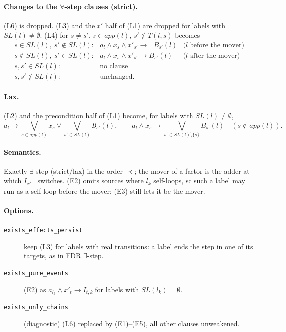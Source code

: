 \documentclass[11pt,a4paper]{article}
\newcommand{\lab}[1]{a_{#1}}            %
\newcommand{\st}[1]{x_{#1}}             %
\newcommand{\stn}[1]{x'_{#1}}           %
\newcommand{\SL}{\mathit{SL}}
\newcommand{\app}{\mathit{app}}
\newcommand{\Bef}{B}
\begin{document}
\paragraph{Changes to the $\forall$-step clauses (strict).}
(L6) is dropped. (L3) and the $x'$ half of (L1) are dropped for labels with $\SL(l) \neq \emptyset$.
(L4) for $s \neq s'$, $s \in \app(l)$, $s' \notin T(l,s)$ becomes
\[
  \begin{array}{lll}
    s \in \SL(l),\ s' \notin \SL(l): & \lab{l} \wedge \st{s} \wedge \stn{s'} \to \neg \Bef_{s'}(l) & \text{($l$ before the mover)}\\
    s \notin \SL(l),\ s' \in \SL(l): & \lab{l} \wedge \st{s} \wedge \stn{s'} \to \Bef_{s'}(l) & \text{($l$ after the mover)}\\
    s, s' \in \SL(l): & \text{no clause} & \\
    s, s' \notin \SL(l): & \text{unchanged.} &
  \end{array}
\]

\paragraph{Lax.} (L2) and the precondition half of (L1) become, for labels with
$\SL(l) \neq \emptyset$,
\[
  \lab{l} \to \textstyle\bigvee_{s \in \app(l)} \st{s} \vee \bigvee_{s' \in \SL(l)} \Bef_{s'}(l),
  \qquad
  \lab{l} \wedge \st{s} \to \textstyle\bigvee_{s' \in \SL(l) \setminus \{s\}} \Bef_{s'}(l) \quad (s \notin \app(l)).
\]

\paragraph{Semantics.} Exactly $\exists$-step (strict/lax) in the order $\prec$; the mover of a
factor is the adder at which $I_{x',\cdot}$ switches. (E2) omits sources where $l_k$ self-loops, so
such a label may run as a self-loop before the mover; (E3) still lets it be the mover.

\paragraph{Options.}
\begin{description}
  \item[\texttt{exists\_effects\_persist}] keep (L3) for labels with real transitions: a label ends
        the step in one of its targets, as in FDR $\exists$-step.
  \item[\texttt{exists\_pure\_events}] (E2) as $\lab{l_k} \wedge \stn{t} \to I_{t,k}$ for labels with
        $\SL(l_k) = \emptyset$.
  \item[\texttt{exists\_only\_chains}] (diagnostic) (L6) replaced by (E1)--(E5), all other clauses
        unweakened.
\end{description}
\end{document}
